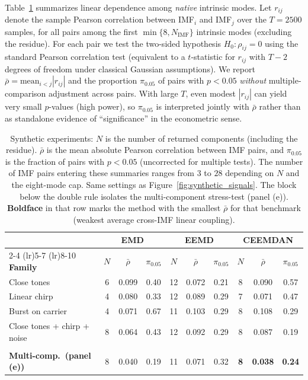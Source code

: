 \documentclass[11pt,a4paper]{article}
\begin{document}
Table~\ref{tab:synthetic_emd_summary} summarizes linear dependence among \emph{native} intrinsic modes. Let $r_{ij}$ denote the sample Pearson correlation between IMF$_i$ and IMF$_j$ over the $T=2500$ samples, for all pairs among the first $\min\{8,N_{\mathrm{IMF}}\}$ intrinsic modes (excluding the residue). For each pair we test the two-sided hypothesis $H_0:\rho_{ij}=0$ using the standard Pearson correlation test (equivalent to a $t$-statistic for $r_{ij}$ with $T-2$ degrees of freedom under classical Gaussian assumptions). We report $\bar{\rho}=\mathrm{mean}_{i<j}|r_{ij}|$ and the proportion $\pi_{0.05}$ of pairs with $p<0.05$ \emph{without} multiple-comparison adjustment across pairs. With large $T$, even modest $|r_{ij}|$ can yield very small $p$-values (high power), so $\pi_{0.05}$ is interpreted jointly with $\bar{\rho}$ rather than as standalone evidence of ``significance'' in the econometric sense.

\begin{table}[ht!]
\centering
\scriptsize
\setlength{\tabcolsep}{3pt}
\caption{Synthetic experiments: $N$ is the number of returned components (including the residue). $\bar{\rho}$ is the mean absolute Pearson correlation between IMF pairs, and $\pi_{0.05}$ is the fraction of pairs with $p<0.05$ (uncorrected for multiple tests). The number of IMF pairs entering these summaries ranges from $3$ to $28$ depending on $N$ and the eight-mode cap. Same settings as Figure~\ref{fig:synthetic_signals}. The block below the double rule isolates the multi-component stress-test (panel (e)). \textbf{Boldface} in that row marks the method with the smallest $\bar{\rho}$ for that benchmark (weakest average cross-IMF linear coupling).}
\label{tab:synthetic_emd_summary}
\begin{tabular}{l*{9}{c}}
\toprule
 & \multicolumn{3}{c}{\textbf{EMD}} & \multicolumn{3}{c}{\textbf{EEMD}} & \multicolumn{3}{c}{\textbf{CEEMDAN}} \\
\cmidrule(lr){2-4} \cmidrule(lr){5-7} \cmidrule(lr){8-10}
\textbf{Family} & $N$ & $\bar{\rho}$ & $\pi_{0.05}$ & $N$ & $\bar{\rho}$ & $\pi_{0.05}$ & $N$ & $\bar{\rho}$ & $\pi_{0.05}$ \\
\midrule
Close tones & 6 & 0.099 & 0.40 & 12 & 0.072 & 0.21 & 8 & 0.090 & 0.57 \\
Linear chirp & 4 & 0.080 & 0.33 & 12 & 0.089 & 0.29 & 7 & 0.071 & 0.47 \\
Burst on carrier & 4 & 0.071 & 0.67 & 11 & 0.103 & 0.29 & 8 & 0.108 & 0.29 \\
Close tones + chirp + noise & 8 & 0.064 & 0.43 & 12 & 0.092 & 0.29 & 8 & 0.087 & 0.19 \\
\addlinespace[3pt]
\midrule
\midrule
\multicolumn{10}{l}{\scriptsize\emph{Stress-test: highly aggregated multi-component signal (Figure~\ref{fig:synthetic_signals}(e))}} \\[2pt]
\textbf{Multi-comp.\ (panel (e))} & 8 & 0.040 & 0.19 & 11 & 0.071 & 0.32 & \textbf{8} & \textbf{0.038} & \textbf{0.24} \\
\bottomrule
\end{tabular}
\end{table}
\end{document}
